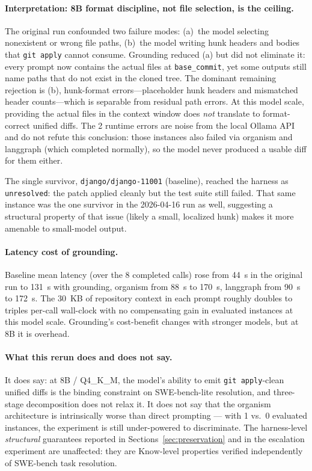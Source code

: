 \paragraph{Interpretation: 8B format discipline, not file selection, is the ceiling.} The original run confounded two failure modes: (a)~the model selecting nonexistent or wrong file paths, (b)~the model writing hunk headers and bodies that \texttt{git apply} cannot consume. Grounding reduced (a) but did not eliminate it: every prompt now contains the actual files at \texttt{base\_commit}, yet some outputs still name paths that do not exist in the cloned tree. The dominant remaining rejection is (b), hunk-format errors---placeholder hunk headers and mismatched header counts---which is separable from residual path errors. At this model scale, providing the actual files in the context window does \emph{not} translate to format-correct unified diffs. The 2 runtime errors are noise from the local Ollama API and do not refute this conclusion: those instances also failed via organism and langgraph (which completed normally), so the model never produced a usable diff for them either.

The single survivor, \texttt{django/django-11001} (baseline), reached the harness as \texttt{unresolved}: the patch applied cleanly but the test suite still failed. That same instance was the one survivor in the 2026-04-16 run as well, suggesting a structural property of that issue (likely a small, localized hunk) makes it more amenable to small-model output.

\paragraph{Latency cost of grounding.} Baseline mean latency (over the 8 completed calls) rose from 44~s in the original run to 131~s with grounding, organism from 88~s to 170~s, langgraph from 90~s to 172~s. The 30~KB of repository context in each prompt roughly doubles to triples per-call wall-clock with no compensating gain in evaluated instances at this model scale. Grounding's cost-benefit changes with stronger models, but at 8B it is overhead.

\paragraph{What this rerun does and does not say.} It does say: at 8B / Q4\_K\_M, the model's ability to emit \texttt{git apply}-clean unified diffs is the binding constraint on SWE-bench-lite resolution, and three-stage decomposition does not relax it. It does not say that the organism architecture is intrinsically worse than direct prompting --- with 1 vs.\ 0 evaluated instances, the experiment is still under-powered to discriminate. The harness-level \emph{structural} guarantees reported in Sections~\ref{sec:preservation} and in the escalation experiment are unaffected: they are $\mathrm{Know}$-level properties verified independently of SWE-bench task resolution.

